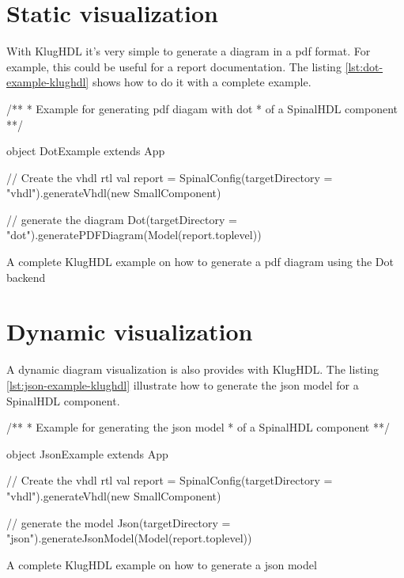 \section{Static visualization}
\label{sec:static-visualization}

With KlugHDL it's very simple to generate a diagram in a pdf format. For example, this could be
useful for a report documentation. The listing \ref{lst:dot-example-klughdl}
shows how to do it with a complete example.

\begin{listing}[H]
  \centering
  \begin{scalacode}
  /**
   * Example for generating pdf diagam with dot
   * of a SpinalHDL component
  **/
   
   object DotExample extends App {

    // Create the vhdl rtl
    val report = SpinalConfig(targetDirectory = "vhdl").generateVhdl(new SmallComponent)

    // generate the diagram
    Dot(targetDirectory = "dot").generatePDFDiagram(Model(report.toplevel))
  }
  \end{scalacode}
  \caption[KlugHDL example on how to generate a pdf diagram]{A complete KlugHDL
    example on how to generate a pdf diagram using the Dot backend}
  \label{lst:dot-example-klughdl}
\end{listing}

\section{Dynamic visualization}
\label{sec:dynamic-visualization}

A dynamic diagram visualization is also provides with KlugHDL. The listing
\ref{lst:json-example-klughdl} illustrate how to generate the json model for a
SpinalHDL component.

\begin{listing}[H]
  \centering
  \begin{scalacode}
  /**
   * Example for generating the json model
   * of a SpinalHDL component
   **/

   object JsonExample extends App {
     
     // Create the vhdl rtl
    val report = SpinalConfig(targetDirectory = "vhdl").generateVhdl(new SmallComponent)

     // generate the model
     Json(targetDirectory = "json").generateJsonModel(Model(report.toplevel))
   }
  \end{scalacode}
  \caption[KlugHDL example on how to generate a json model]{A complete KlugHDL
    example on how to generate a json model}
  \label{lst:json-example-klughdl}
\end{listing}

